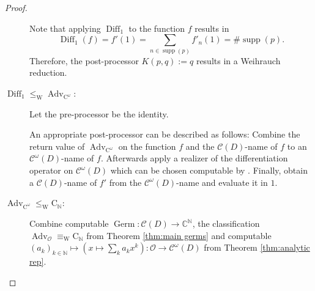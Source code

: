 \documentclass{eptcs-modified}
\newcommand{\leqW}{\leq_{\textrm{W}}}
\newcommand{\equivW}{\equiv_{\textrm{W}}}
\newcommand{\CCN}{\mathrm{C}_{\NN}}
\newcommand{\C}{\textrm{C}}
\newcommand{\NN}{\mathbb{N}}
\newcommand{\OO}{\mathcal{O}}
\newcommand{\germs}{\OO}
\newcommand{\analytic}{\mathcal C^\omega(D)}
\newcommand{\cont}{\mathcal C(D)}
\newcommand{\Advc}{\operatorname{Adv}_{\C^\omega}}
\newcommand{\Advg}{\operatorname{Adv}_{\germs}}
\newcommand{\Diff}{\operatorname{Diff}}
\newcommand{\supp}{\operatorname{supp}}
\newcommand{\card}[1]{\#{#1}}
\begin{document}
\begin{proof}
\begin{description}
						Note that applying $\Diff_1$ to the function $f$ results in
						\[ \Diff_1(f) = f'(1) = \sum_{n\in\supp(p)} f'_n(1) =\card{\supp(p)}. \]
						Therefore, the post-processor $K(p,q):=q$ results in a Weihrauch reduction.
					\item[$\Diff_1\leqW\Advc$:]
						Let the pre-processor be the identity.

						An appropriate post-processor can be described as follows: Combine the return value of $\Advc$ on the function $f$ and the $\cont$-name of $f$ to an $\analytic$-name of $f$.
						Afterwards apply a realizer of the differentiation operator on $\analytic$ which can be chosen computable by .
						Finally, obtain a $\cont$-name of $f'$ from the $\analytic$-name and evaluate it in $1$.
					\item[$\Advc\leqW\CCN$:] Combine computable $\operatorname{Germ} : \mathcal{C}(D) \to \mathbb{C}^\mathbb{N}$, the classification $\Advg \equivW \CCN$ from Theorem \ref{thm:main germs} and computable $(a_k)_{k\in\NN} \mapsto \left(x\mapsto \sum_k a_k x^k \right ) :  \OO\to \analytic$ from Theorem \ref{thm:analytic rep}.
				\end{description}
			\end{proof}
\end{document}
